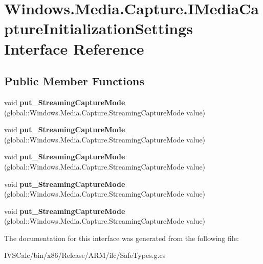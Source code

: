 \hypertarget{interface_windows_1_1_media_1_1_capture_1_1_i_media_capture_initialization_settings}{}\section{Windows.\+Media.\+Capture.\+I\+Media\+Capture\+Initialization\+Settings Interface Reference}
\label{interface_windows_1_1_media_1_1_capture_1_1_i_media_capture_initialization_settings}
\subsection*{Public Member Functions}
\begin{DoxyCompactItemize}
\item 
\mbox{\label{interface_windows_1_1_media_1_1_capture_1_1_i_media_capture_initialization_settings_a5569980c3b66fe034b0f26be020c63db}} 
void {\bfseries put\+\_\+\+Streaming\+Capture\+Mode} (global\+::\+Windows.\+Media.\+Capture.\+Streaming\+Capture\+Mode value)
\item 
\mbox{\label{interface_windows_1_1_media_1_1_capture_1_1_i_media_capture_initialization_settings_a5569980c3b66fe034b0f26be020c63db}} 
void {\bfseries put\+\_\+\+Streaming\+Capture\+Mode} (global\+::\+Windows.\+Media.\+Capture.\+Streaming\+Capture\+Mode value)
\item 
\mbox{\label{interface_windows_1_1_media_1_1_capture_1_1_i_media_capture_initialization_settings_a5569980c3b66fe034b0f26be020c63db}} 
void {\bfseries put\+\_\+\+Streaming\+Capture\+Mode} (global\+::\+Windows.\+Media.\+Capture.\+Streaming\+Capture\+Mode value)
\item 
\mbox{\label{interface_windows_1_1_media_1_1_capture_1_1_i_media_capture_initialization_settings_a5569980c3b66fe034b0f26be020c63db}} 
void {\bfseries put\+\_\+\+Streaming\+Capture\+Mode} (global\+::\+Windows.\+Media.\+Capture.\+Streaming\+Capture\+Mode value)
\item 
\mbox{\label{interface_windows_1_1_media_1_1_capture_1_1_i_media_capture_initialization_settings_a5569980c3b66fe034b0f26be020c63db}} 
void {\bfseries put\+\_\+\+Streaming\+Capture\+Mode} (global\+::\+Windows.\+Media.\+Capture.\+Streaming\+Capture\+Mode value)
\end{DoxyCompactItemize}


The documentation for this interface was generated from the following file\+:\begin{DoxyCompactItemize}
\item 
I\+V\+S\+Calc/bin/x86/\+Release/\+A\+R\+M/ilc/Safe\+Types.\+g.\+cs\end{DoxyCompactItemize}
